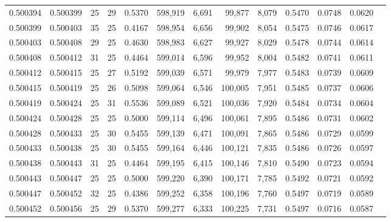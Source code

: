 \begin{tabular}{rrrrrrrrrrrrr}
0.500394 & 0.500399 &    25 &  29 &                                     0.5370 & 598,919 &   6,691 &  99,877 &   8,079 & 0.5470 & 0.0748 & 0.0620 \\
0.500399 & 0.500403 &    35 &  25 &                                     0.4167 & 598,954 &   6,656 &  99,902 &   8,054 & 0.5475 & 0.0746 & 0.0617 \\
0.500403 & 0.500408 &    29 &  25 &                                     0.4630 & 598,983 &   6,627 &  99,927 &   8,029 & 0.5478 & 0.0744 & 0.0614 \\
0.500408 & 0.500412 &    31 &  25 &                                     0.4464 & 599,014 &   6,596 &  99,952 &   8,004 & 0.5482 & 0.0741 & 0.0611 \\
0.500412 & 0.500415 &    25 &  27 &                                     0.5192 & 599,039 &   6,571 &  99,979 &   7,977 & 0.5483 & 0.0739 & 0.0609 \\
0.500415 & 0.500419 &    25 &  26 &                                     0.5098 & 599,064 &   6,546 & 100,005 &   7,951 & 0.5485 & 0.0737 & 0.0606 \\
0.500419 & 0.500424 &    25 &  31 &                                     0.5536 & 599,089 &   6,521 & 100,036 &   7,920 & 0.5484 & 0.0734 & 0.0604 \\
0.500424 & 0.500428 &    25 &  25 &                                     0.5000 & 599,114 &   6,496 & 100,061 &   7,895 & 0.5486 & 0.0731 & 0.0602 \\
0.500428 & 0.500433 &    25 &  30 &                                     0.5455 & 599,139 &   6,471 & 100,091 &   7,865 & 0.5486 & 0.0729 & 0.0599 \\
0.500433 & 0.500438 &    25 &  30 &                                     0.5455 & 599,164 &   6,446 & 100,121 &   7,835 & 0.5486 & 0.0726 & 0.0597 \\
0.500438 & 0.500443 &    31 &  25 &                                     0.4464 & 599,195 &   6,415 & 100,146 &   7,810 & 0.5490 & 0.0723 & 0.0594 \\
0.500443 & 0.500447 &    25 &  25 &                                     0.5000 & 599,220 &   6,390 & 100,171 &   7,785 & 0.5492 & 0.0721 & 0.0592 \\
0.500447 & 0.500452 &    32 &  25 &                                     0.4386 & 599,252 &   6,358 & 100,196 &   7,760 & 0.5497 & 0.0719 & 0.0589 \\
0.500452 & 0.500456 &    25 &  29 &                                     0.5370 & 599,277 &   6,333 & 100,225 &   7,731 & 0.5497 & 0.0716 & 0.0587 \\

\end{tabular}
